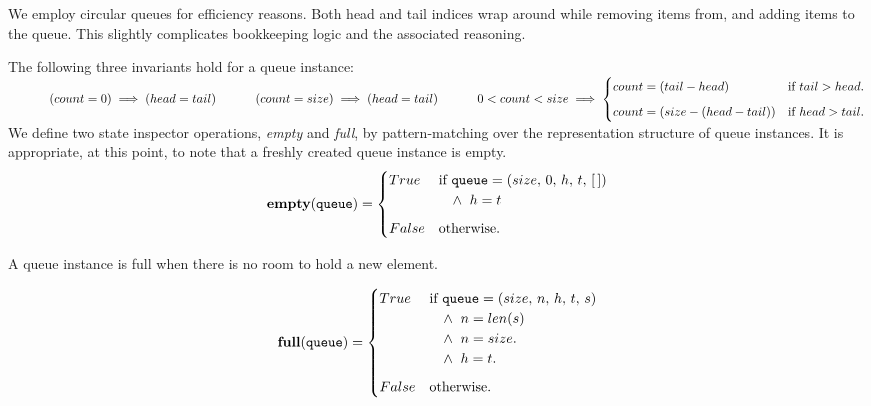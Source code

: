 \documentclass[10pt]{article}
\begin{document}
    We employ circular queues for efficiency reasons. Both head and tail indices wrap around while removing items from, and adding items to the queue. This slightly complicates bookkeeping logic and the associated reasoning. 

    \noindent The following three invariants hold for a queue instance:\vspace*{6pt}\\
    \(
        \hspace*{32pt}(count = 0) \implies (head = tail)\vspace*{6pt}\\
        \hspace*{32pt}(count = size) \implies (head = tail)\vspace*{8pt}\\
        \hspace*{32pt}0 < count < size \implies 
            \begin{cases} 
               count = (tail - head) & \mbox{if  } tail > head. \vspace*{6pt}\\ 
               count = (size - (head - tail)) & \mbox{if } head > tail.\\
            \end{cases} 
    \)\vspace*{6pt}\\

    We define two state inspector operations, \emph{empty} and \emph{full}, by pattern-matching over the representation structure of queue instances. It is appropriate, at this point, to note that a freshly created queue instance is empty.
    \vspace*{3pt}\\
    \[
        \mathtt{\mathbf{empty}(queue)} = \begin{cases} True & \mbox{if  } \mathtt{queue} = (size, \, 0, \, h, \, t, \, [\,])\\
        &\hspace*{10pt}\wedge\;\; h = t \vspace*{6pt}\\ 
        False & \mbox{otherwise}. \end{cases} 
    \]

    A queue instance is full when there is no room to hold a new element.

    \[
        \mathtt{\mathbf{full}(queue)} = \begin{cases} True & \mbox{if  } \mathtt{queue} = (size, \, n, \, h, \, t, \, s) \\
            &\hspace*{10pt}\wedge\;\; n = len(s) \\
            & \hspace*{10pt}\wedge\;\;  n = size. \\
            & \hspace*{10pt}\wedge\;\;  h = t. \vspace*{6pt}\\ 
        False & \mbox{otherwise}. \end{cases} 
    \]
    
\end{document}
